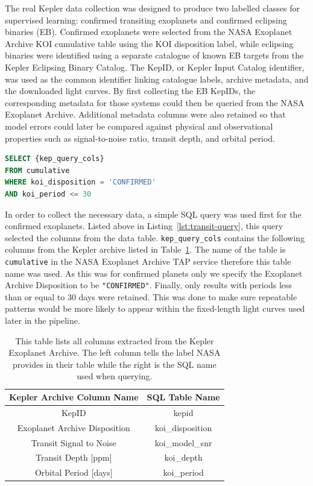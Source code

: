 The real Kepler data collection was designed to produce two labelled classes for supervised learning: confirmed transiting exoplanets and confirmed eclipsing binaries (EB). Confirmed exoplanets were selected from the NASA Exoplanet Archive KOI cumulative table using the KOI disposition label, while eclipsing binaries were identified using a separate catalogue of known EB targets from the Kepler Eclipsing Binary Catalog. The KepID, or Kepler Input Catalog identifier, was used as the common identifier linking catalogue labels, archive metadata, and the downloaded light curves. By first collecting the EB KepIDs, the corresponding metadata for those systems could then be queried from the NASA Exoplanet Archive. Additional metadata columns were also retained so that model errors could later be compared against physical and observational properties such as signal-to-noise ratio, transit depth, and orbital period.

\begin{lstlisting}[language=SQL, caption={SQL query used to extract confirmed Kepler exoplanets data from Kepler Exoplanet Archive.}, label={lst:transit-query}]
SELECT {kep_query_cols}
FROM cumulative
WHERE koi_disposition = 'CONFIRMED'
AND koi_period <= 30
\end{lstlisting}

In order to collect the necessary data, a simple SQL query was used first for the confirmed exoplanets. Listed above in Listing~\ref{lst:transit-query}, this query selected the columns from the data table.  \texttt{kep\_query\_cols} contains the following columns from the Kepler archive listed in Table~\ref{tab:kep_query_cols}. The name of the table is \texttt{cumulative} in the NASA Exoplanet Archive TAP service therefore this table name was used. As this was for confirmed planets only we specify the Exoplanet Archive Disposition to be \texttt{"CONFIRMED"}. Finally, only results with periods less than or equal to 30 days were retained. This was done to make sure repeatable patterns would be more likely to appear within the fixed-length light curves used later in the pipeline.

\begin{table}[h]
    \centering
    \begin{tabular}{|c|c|}\hline
       Kepler Archive Column Name  & SQL Table Name \\\hline
        KepID & kepid \\\hline
        Exoplanet Archive Disposition & koi\_disposition\\\hline
        Transit Signal to Noise & koi\_model\_snr \\\hline
        Transit Depth [ppm] & koi\_depth \\\hline
        Orbital Period [days] & koi\_period
    \\ \hline\end{tabular}
    \caption{This table lists all columns extracted from the Kepler Exoplanet Archive. The left column tells the label NASA provides in their table while the right is the SQL name used when querying.}
    \label{tab:kep_query_cols}
\end{table}

